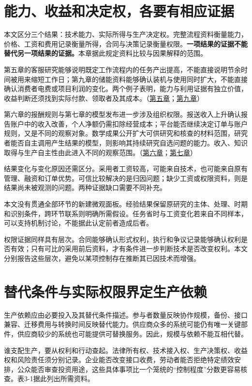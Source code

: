 \documentclass[UTF8,fontset=windows,12pt,a4paper,oneside,openany]{ctexbook}
\begin{document}
\section{能力、收益和决定权，各要有相应证据}

本文区分三个结果：技术能力、实际所得与生产决定权。完整流程资料衡量能力，价格、工资和费用记录衡量所得，合同与决策记录衡量权限。\textbf{一项结果的证据不能替代另一项结果的证据。}本章据此规定资料比较与因果解释的范围。

第五章的客服研究能够说明既定工作流程内的任务产出提高，不能直接说明节余时间被用来缩短工作日；第九章的储能资料能够确认装机与使用同时扩大，不能直接确认消费者电费或项目利润的变化。两个例子表明，能力与利用证据有独立价值，收益判断还须找到实际付款、领取者及其成本。（\hyperref[ch:5]{第五章}；\hyperref[ch:9]{第九章}）

第六章的报酬规则与第七章的模型发布进一步涉及组织权限。报送收入上升确认报告账户中的收入改善，个人净额仍需扣除经营成本；平台能否继续决定订单与账户规则，又是不同的观察对象。数学成果公开扩大可供研究和核查的材料范围，研究者能否自主调用产生结果的模型，则影响其持续研究自选问题的能力。收入、知识取得与生产自主性由此进入不同的观察范围。（\hyperref[ch:6]{第六章}；\hyperref[ch:7]{第七章}）

结果变化与变化原因还需区分。采用者工资较高，可能来自技术，也可能来自原有管理、融资和订单优势。可信比较解决的是归因问题；缺少工资或权限资料，则是结果尚未被观测的问题。两种证据缺口需要不同补充。

本文没有贯通全部环节的新建微观面板。经验结果保留原研究的主体、处理、时期和识别条件，跨环节联系则明确所需假设。任务省时与工资变化若来自不同样本，可以支持机制讨论，不能据此认定前者造成后者。

权限证据同样具有层次。合同能够确认形式权利，执行和争议记录能够确认权利是否有效；只有可比的采用前后资料，才有条件进一步判断技术是否改变权利。本文分别报告这些层次，避免以某项控制存在推断其已因技术而增强。

\section{替代条件与实际权限界定生产依赖}

生产依赖应由必要投入及其替代条件描述。参与者数量反映协作规模，备份、接口兼容、迁移费用与转换时间反映替代能力。供应商众多的系统可能仍有唯一关键部件，供应商较少的系统也可能提供可替换服务。因此，规模与依赖不能互相代替。

谁支配生产，要从权利和行动查起。法律所有权、技术接入权、生产决策权、收益权和风险责任须分别记录。企业能否改变接口收费，劳动者能否拒绝特定绩效安排，公众能否审查投资用途，这些具体事项比一个笼统的“控制程度”分数更容易核查。表3-1据此列出所需资料。
\end{document}
